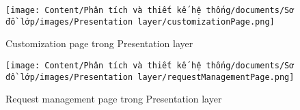 \begin{figure}[H]
    \centering
    \texttt{[image: Content/Phân tích và thiết kế hệ thống/documents/Sơ đồ lớp/images/Presentation layer/customizationPage.png]}
    \vspace{0.5cm}
    \caption{Customization page trong Presentation layer}
    \label{fig:Customization page trong Presentation layer}
\end{figure}

\begin{figure}[H]
    \centering
    \texttt{[image: Content/Phân tích và thiết kế hệ thống/documents/Sơ đồ lớp/images/Presentation layer/requestManagementPage.png]}
    \vspace{0.5cm}
    \caption{Request management page trong Presentation layer}
    \label{fig:Request management page trong Presentation layer}
\end{figure}